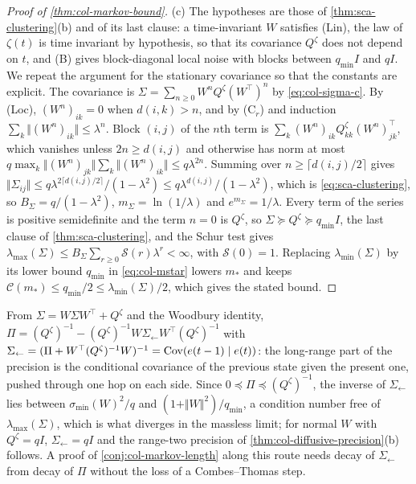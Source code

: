 \begin{proof}[Proof of \cref{thm:col-markov-bound}]
(c) The hypotheses are those of \cref{thm:sca-clustering}(b) and of its last clause: a time-invariant $W$ satisfies \textup{(Lin)}, the law of $\zeta(t)$ is time invariant by hypothesis, so that its covariance $Q^{\zeta}$ does not depend on $t$, and \textup{(B)} gives block-diagonal local noise with blocks between $q_{\min}I$ and $qI$. We repeat the argument for the stationary covariance so that the constants are explicit. The covariance is $\Sigma=\sum_{n\ge0}W^nQ^{\zeta}(W^\top)^n$ by \eqref{eq:col-sigma-c}. By \textup{(Loc)}, $(W^n)_{ik}=0$ when $d(i,k)>n$, and by \textup{(C$_r$)} and induction $\sum_k\Vert(W^n)_{ik}\Vert\le\lambda^n$. Block $(i,j)$ of the $n$th term is $\sum_k(W^n)_{ik}Q^{\zeta}_{kk}(W^n)_{jk}^\top$, which vanishes unless $2n\ge d(i,j)$ and otherwise has norm at most $q\max_k\Vert(W^n)_{jk}\Vert\sum_k\Vert(W^n)_{ik}\Vert\le q\lambda^{2n}$. Summing over $n\ge\lceil d(i,j)/2\rceil$ gives $\Vert\Sigma_{ij}\Vert\le q\lambda^{2\lceil d(i,j)/2\rceil}/(1-\lambda^2)\le q\lambda^{d(i,j)}/(1-\lambda^2)$, which is \eqref{eq:sca-clustering}, so $B_\Sigma=q/(1-\lambda^2)$, $m_\Sigma=\ln(1/\lambda)$ and $e^{m_\Sigma}=1/\lambda$. Every term of the series is positive semidefinite and the term $n=0$ is $Q^{\zeta}$, so $\Sigma\succeq Q^{\zeta}\succeq q_{\min}I$, the last clause of \cref{thm:sca-clustering}, and the Schur test gives $\lambda_{\max}(\Sigma)\le B_\Sigma\sum_{r\ge0}\mathcal S(r)\lambda^r<\infty$, with $\mathcal S(0)=1$. Replacing $\lambda_{\min}(\Sigma)$ by its lower bound $q_{\min}$ in \eqref{eq:col-mstar} lowers $m_*$ and keeps $\mathcal C(m_*)\le q_{\min}/2\le\lambda_{\min}(\Sigma)/2$, which gives the stated bound.
\end{proof}

\begin{remark}\label{rem:col-backward}
From $\Sigma=W\Sigma W^\top+Q^{\zeta}$ and the Woodbury identity, $\Pi=(Q^{\zeta})^{-1}-(Q^{\zeta})^{-1}W\Sigma_{\leftarrow}W^\top(Q^{\zeta})^{-1}$ with $\Sigma_{\leftarrow}=(\Pi+W^\top(Q^{\zeta})^{-1}W)^{-1}=\operatorname{Cov}(e(t-1)\mid e(t))$: the long-range part of the precision is the conditional covariance of the previous state given the present one, pushed through one hop on each side. Since $0\preceq\Pi\preceq(Q^{\zeta})^{-1}$, the inverse of $\Sigma_{\leftarrow}$ lies between $\sigma_{\min}(W)^2/q$ and $(1+\Vert W\Vert^2)/q_{\min}$, a condition number free of $\lambda_{\max}(\Sigma)$, which is what diverges in the massless limit; for normal $W$ with $Q^{\zeta}=qI$, $\Sigma_{\leftarrow}=qI$ and the range-two precision of \cref{thm:col-diffusive-precision}(b) follows. A proof of \cref{conj:col-markov-length} along this route needs decay of $\Sigma_{\leftarrow}$ from decay of $\Pi$ without the loss of a Combes--Thomas step.
\end{remark}

